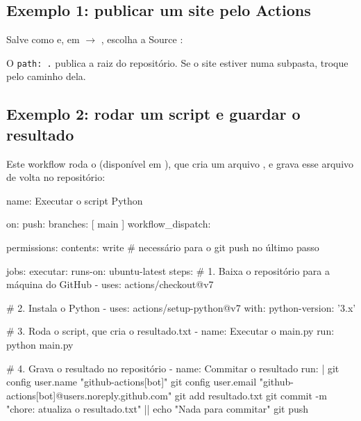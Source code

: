 \subsection{Exemplo 1: publicar um site pelo Actions}

Salve como  e, em 
\(\rightarrow\) , escolha a Source :


O \texttt{path: .} publica a raiz do repositório. Se o site estiver numa
subpasta, troque pelo caminho dela.

\subsection{Exemplo 2: rodar um script e guardar o resultado}

Este workflow roda o  (disponível em ), que cria
um arquivo , e grava esse arquivo de volta no repositório:

\begin{yamlcode}
name: Executar o script Python

on:
  push:
    branches: [ main ]
  workflow_dispatch:

permissions:
  contents: write   # necessário para o git push no último passo

jobs:
  executar:
    runs-on: ubuntu-latest
    steps:
      # 1. Baixa o repositório para a máquina do GitHub
      - uses: actions/checkout@v7

      # 2. Instala o Python
      - uses: actions/setup-python@v7
        with:
          python-version: '3.x'

      # 3. Roda o script, que cria o resultado.txt
      - name: Executar o main.py
        run: python main.py

      # 4. Grava o resultado no repositório
      - name: Commitar o resultado
        run: |
          git config user.name "github-actions[bot]"
          git config user.email "github-actions[bot]@users.noreply.github.com"
          git add resultado.txt
          git commit -m "chore: atualiza o resultado.txt" || echo "Nada para commitar"
          git push
\end{yamlcode}

